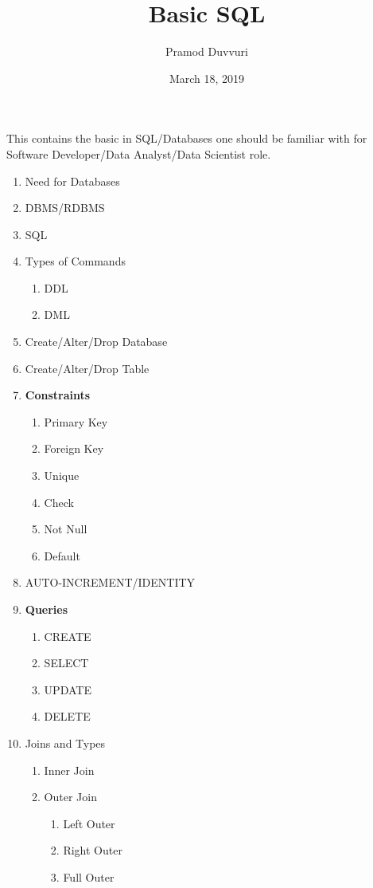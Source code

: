 \documentclass[11pt]{article}
\title{Basic SQL}
\author{Pramod Duvvuri}
\date{March 18, 2019}
\begin{document}
	\maketitle
	This contains the basic in SQL/Databases one should be familiar with for Software Developer/Data Analyst/Data Scientist role. 
	\begin{enumerate}
	\item Need for Databases
	\item DBMS/RDBMS
	\item SQL
	\item Types of Commands
	\begin{enumerate}
		\item DDL
		\item DML
	\end{enumerate}	
    \item Create/Alter/Drop Database 
     \item Create/Alter/Drop Table 
    \item \textbf{Constraints}
    \begin{enumerate}
    	\item Primary Key
    	\item Foreign Key
    	\item Unique
    	\item Check
    	\item Not Null
    	\item Default
    \end{enumerate}
    \item AUTO-INCREMENT/IDENTITY
    \item \textbf{Queries}
    \begin{enumerate}
    	\item CREATE
    	\item SELECT
    	\item UPDATE
    	\item DELETE
    \end{enumerate}
   \item Joins and Types
   \begin{enumerate}
   	\item Inner Join
   	\item Outer Join
   	\begin{enumerate}
   		\item Left Outer
   		\item Right Outer
   		\item Full Outer 

\end{enumerate}
\end{enumerate}
\end{enumerate}
\end{document}
